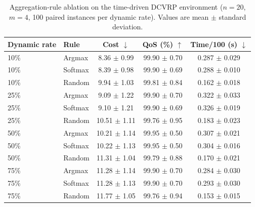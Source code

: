 \begin{table}[t]
\centering
\caption{Aggregation-rule ablation on the time-driven DCVRP environment ($n=20$, $m=4$, 100 paired instances per dynamic rate). Values are mean $\pm$ standard deviation.}
\label{tab:aggregation_ablation}
\begin{tabular}{llccc}
\toprule
Dynamic rate & Rule & Cost $\downarrow$ & QoS (\%) $\uparrow$ & Time/100 (s) $\downarrow$ \\
\midrule
10\% & Argmax & 8.36 $\pm$ 0.99 & 99.90 $\pm$ 0.70 & 0.287 $\pm$ 0.029 \\
10\% & Softmax & 8.39 $\pm$ 0.98 & 99.90 $\pm$ 0.69 & 0.288 $\pm$ 0.010 \\
10\% & Random & 9.94 $\pm$ 1.03 & 99.81 $\pm$ 0.84 & 0.162 $\pm$ 0.018 \\
\midrule
25\% & Argmax & 9.09 $\pm$ 1.22 & 99.90 $\pm$ 0.70 & 0.322 $\pm$ 0.033 \\
25\% & Softmax & 9.10 $\pm$ 1.21 & 99.90 $\pm$ 0.69 & 0.326 $\pm$ 0.019 \\
25\% & Random & 10.51 $\pm$ 1.11 & 99.76 $\pm$ 0.95 & 0.183 $\pm$ 0.023 \\
\midrule
50\% & Argmax & 10.21 $\pm$ 1.14 & 99.95 $\pm$ 0.50 & 0.307 $\pm$ 0.021 \\
50\% & Softmax & 10.22 $\pm$ 1.13 & 99.95 $\pm$ 0.50 & 0.304 $\pm$ 0.016 \\
50\% & Random & 11.31 $\pm$ 1.04 & 99.79 $\pm$ 0.88 & 0.170 $\pm$ 0.021 \\
\midrule
75\% & Argmax & 11.28 $\pm$ 1.14 & 99.90 $\pm$ 0.70 & 0.284 $\pm$ 0.030 \\
75\% & Softmax & 11.28 $\pm$ 1.13 & 99.90 $\pm$ 0.70 & 0.293 $\pm$ 0.030 \\
75\% & Random & 11.77 $\pm$ 1.05 & 99.76 $\pm$ 0.94 & 0.153 $\pm$ 0.015 \\
\bottomrule
\end{tabular}
\end{table}
